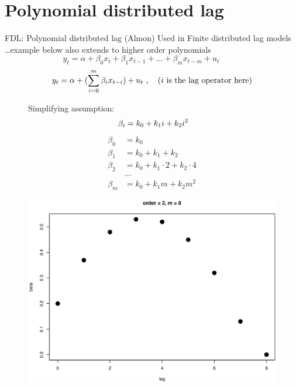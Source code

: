 \documentclass{beamer}
\begin{document}
\section{Polynomial distributed lag}
\begin{frame}{FDL: Polynomial distributed lag (Almon)}
Used in Finite distributed lag models\\
\dots example below also extends to higher order polynomials
\begin{equation} \label{Almon1}
y_t = \alpha + \beta_0 x_t + \beta_1 x_{t-1} + \dots + \beta_m x_{t-m} + u_t~~~~~~~~~~~~
\end{equation}
$$
y_t = \alpha + ( \sum_{i=0}^m \beta_i x_{t-i} ) + u_t~, 
\quad \left( i \textnormal{~is the lag operator here} \right)
$$
\begin{figure}[!htb]
    \centering
    \begin{minipage}{.48\textwidth}
    Simplifying assumption:
\begin{equation} \label{eqpol2}
~\beta_i = k_0 + k_1 i  + k_2  i^2  \\ 
\end{equation}
\hline 
\small{
\begin{equation*}
\begin{aligned}
\beta_0 & = k_0  \\
\beta_1 & = k_0 + k_1 + k_2 \\
\beta_2 & = k_0 + k_1\!\cdot\!2 + k_2\!\cdot\!4 \\
& \ldots \\ 
\beta_m & = k_0 +  k_1 m +  k_2 m^2 
\end{aligned}
\end{equation*}
}%
\end{minipage}
\begin{minipage}{0.509\textwidth}
\includegraphics[width=\textwidth]{img/Polynom_2.eps}
\end{minipage}
\end{figure}
\end{frame}
\end{document}
